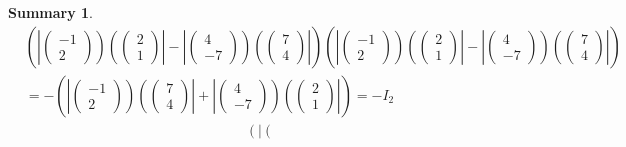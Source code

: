 \documentclass[aps,preprint]{revtex4}
\newtheorem{summary}[theorem]{Summary}
\begin{document}
\begin{summary}
\begin{align}
& \left( \left\vert \left( 
\begin{array}{c}
-1 \\ 
2%
\end{array}%
\right) \right) \left( \left( 
\begin{array}{c}
2 \\ 
1%
\end{array}%
\right) \right\vert -\left\vert \left( 
\begin{array}{c}
4 \\ 
-7%
\end{array}%
\right) \right) \left( \left( 
\begin{array}{c}
7 \\ 
4%
\end{array}%
\right) \right\vert \right) \left( \left\vert \left( 
\begin{array}{c}
-1 \\ 
2%
\end{array}%
\right) \right) \left( \left( 
\begin{array}{c}
2 \\ 
1%
\end{array}%
\right) \right\vert -\left\vert \left( 
\begin{array}{c}
4 \\ 
-7%
\end{array}%
\right) \right) \left( \left( 
\begin{array}{c}
7 \\ 
4%
\end{array}%
\right) \right\vert \right) \\
& =-\left( \left\vert \left( 
\begin{array}{c}
-1 \\ 
2%
\end{array}%
\right) \right) \left( \left( 
\begin{array}{c}
7 \\ 
4%
\end{array}%
\right) \right\vert +\left\vert \left( 
\begin{array}{c}
4 \\ 
-7%
\end{array}%
\right) \right) \left( \left( 
\begin{array}{c}
2 \\ 
1%
\end{array}%
\right) \right\vert \right) =-I_{2}
\end{align}%
\begin{align}
& \left( \left\vert \left( 
\begin{array}{c}

\end{array}
\end{align}
\end{summary}
\end{document}
